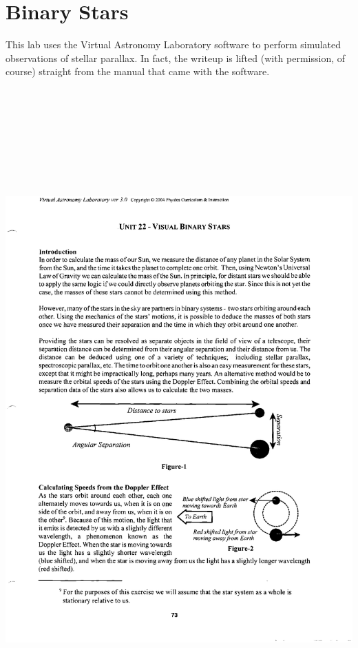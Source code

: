 \chapter{Binary Stars}

This lab uses the Virtual Astronomy Laboratory software to perform
simulated observations of stellar parallax.  In fact, the writeup
is lifted (with permission, of course) straight from the manual
that came with the software.


\newpage

\includegraphics[height=10in]{val/binaries1.eps}

